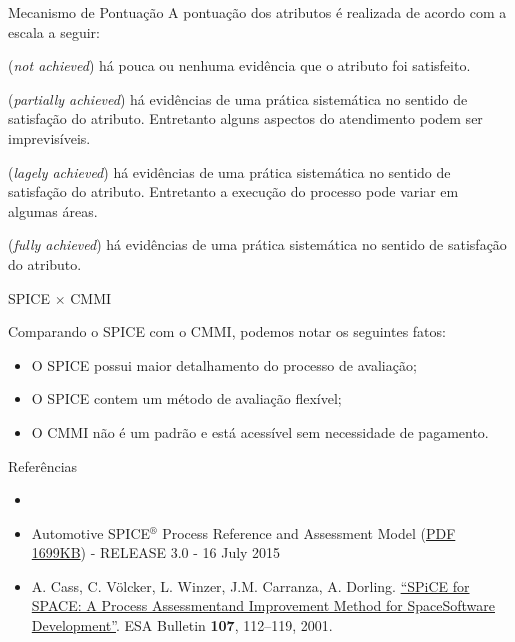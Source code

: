 \begin{frame}{Mecanismo de Pontuação}
  A pontuação dos atributos é realizada de acordo com a escala a seguir:

  \begin{description}[<+->]
  \item[N (0 a 15\%):] ({\em not achieved}) há pouca ou nenhuma evidência que 
    o atributo foi satisfeito.
  \item[P (16 a 50\%):] ({\em partially achieved}) há evidências de uma prática 
    sistemática no sentido de satisfação do atributo. Entretanto alguns aspectos 
    do atendimento podem ser imprevisíveis.
  \item[L (51 a 85\%):] ({\em lagely achieved}) há evidências de uma prática 
    sistemática no sentido de satisfação do atributo. Entretanto a execução do 
    processo pode variar em algumas áreas.
  \item[F (86 a 100\%):] ({\em fully achieved}) há evidências de uma
    prática sistemática no sentido de satisfação do atributo.
  \end{description}
\end{frame}

\begin{frame}{SPICE $\times$ CMMI}

  Comparando o SPICE com o CMMI, podemos notar os seguintes fatos:

  \begin{itemize}[<+->]
  \item O SPICE possui maior detalhamento do processo de avaliação;
  \item O SPICE contem um método de avaliação flexível;
  \item O CMMI não é um padrão e está acessível sem necessidade de pagamento.
  \end{itemize}
  
\end{frame}

\begin{frame}{Referências}
  \begin{itemize}
  \item \ariadneref
  \item Automotive SPICE$^®$ Process Reference and Assessment Model
    (\href{http://www.automotivespice.com/fileadmin/software-download/Automotive_SPICE_PAM_30.pdf}{PDF
      1699KB}) - RELEASE 3.0 - 16 July 2015
  \item A. Cass, C. Völcker, L. Winzer, J.M. Carranza, A. Dorling. \href{http://www.esa.int/esapub/bulletin/bullet107/bul107_14.pdf}{``SPiCE for SPACE: A Process Assessmentand Improvement Method for SpaceSoftware Development''}. ESA Bulletin {\bf 107}, 112--119, 2001.
  \end{itemize}
  
\end{frame}